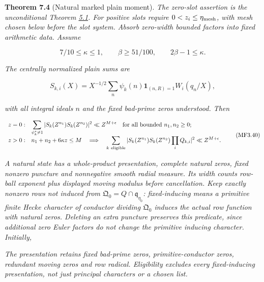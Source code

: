 \textbf{Theorem 7.4} (Natural marked plain moment). \emph{\hypertarget{mf:plain}{}\label{mf:plain} The zero-slot assertion is the unconditional Theorem \protect\hyperlink{cf:mixed-plain-moment}{5.1}. For positive slots require \(0<z_i\le\eta_{\rm mesh}\), with mesh chosen below before the slot system. Absorb zero-width bounded factors into fixed arithmetic data. Assume}

\[
7/10\le\kappa\le1,\qquad \beta\ge51/100,\qquad
2\beta-1\le\kappa.
\]

\emph{The centrally normalized plain sums are}

\[
S_{k,i}(X)=X^{-1/2}\sum_{n}\psi_k(n)\mathbf1_{(n,R)=1}
 W_i(q_n/X),
\]

\emph{with all integral ideals \(n\) and the fixed bad-prime zeros understood. Then \hypertarget{mf:eq:B3.40}{}\label{mf:eq:B3.40}}

\[
\begin{array}{ll}
z=0:&\displaystyle
 \sum_{\psi_k^*\ne1}|S_k(Z^{n_1})S_k(Z^{n_2})|^2\ll Z^{M+\epsilon}
 \quad\text{for all bounded }n_1,n_2\ge0;\\[2mm]
z>0:&\displaystyle
 n_1+n_2+6\kappa z\le M
 \quad\Longrightarrow\quad
 \sum_{k\ {\rm eligible}}|S_k(Z^{n_1})S_k(Z^{n_2})\prod_iQ_{k,i}|^2
 \ll Z^{M+\epsilon}.
\end{array}\qquad\text{(MF3.40)}
\]

\emph{A natural state has a whole-product presentation, complete natural zeros, fixed nonzero puncture and nonnegative smooth radial measure. Its width counts row-ball exponent plus displayed moving modulus before cancellation. Keep exactly nonzero rows not induced from \(\mathfrak Q_0=Q\cap\mathfrak q_{\eta_0}\): fixed-inducing means a primitive finite Hecke character of conductor dividing \(\mathfrak Q_0\) induces the actual row function with natural zeros. Deleting an extra puncture preserves this predicate, since additional zero Euler factors do not change the primitive inducing character. Initially,}

\par\noindent\resizebox{\linewidth}{!}{\begin{minipage}{\dimexpr\linewidth+7.89476pt\relax}\[
\operatorname{initialKeep}(\eta,\mathfrak Q_0)
=\{k\in\mathcal O:k\ne0,\ \text{the natural presentation of }n\mapsto\eta(n)\chi_n(k)
\text{ is not induced from }\mathfrak Q_0\}.
\]\end{minipage}}\par

\emph{The presentation retains fixed bad-prime zeros, primitive-conductor zeros, redundant moving zeros and row radical. Eligibility excludes every fixed-inducing presentation, not just principal characters or a chosen list.}

